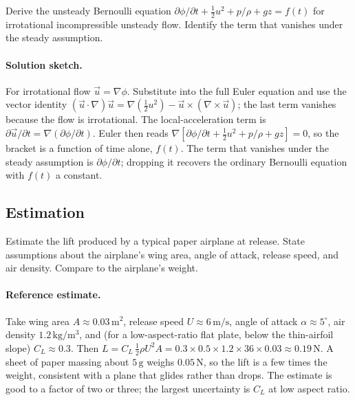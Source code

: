 \begin{exercise}
Derive the unsteady Bernoulli equation $\partial \phi/\partial t +
\tfrac{1}{2}u^2 + p/\rho + gz = f(t)$ for irrotational
incompressible unsteady flow. Identify the term that vanishes
under the steady assumption.

\paragraph{Solution sketch.} For irrotational flow $\vec{u} =
\nabla\phi$. Substitute into the full Euler equation and use the
vector identity $(\vec{u}\cdot\nabla)\vec{u} = \nabla(\tfrac12 u^2) -
\vec{u}\times(\nabla\times\vec{u})$; the last term vanishes because
the flow is irrotational. The local-acceleration term is
$\partial\vec{u}/\partial t = \nabla(\partial\phi/\partial t)$. Euler
then reads $\nabla[\partial\phi/\partial t + \tfrac12 u^2 + p/\rho +
gz] = 0$, so the bracket is a function of time alone, $f(t)$. The
term that vanishes under the steady assumption is $\partial\phi/
\partial t$; dropping it recovers the ordinary Bernoulli equation
with $f(t)$ a constant.
\end{exercise}

\subsection*{Estimation}

\begin{exercise}
Estimate the lift produced by a typical paper airplane at
release. State assumptions about the airplane's wing area, angle
of attack, release speed, and air density. Compare to the
airplane's weight.

\paragraph{Reference estimate.} Take wing area $A \approx
0.03\,\si{\meter}^2$, release speed $U \approx 6\,\si{\meter\per
\second}$, angle of attack $\alpha \approx 5^\circ$, air density
$1.2\,\si{\kilogram\per\meter\cubed}$, and (for a low-aspect-ratio
flat plate, below the thin-airfoil slope) $C_L \approx 0.3$. Then $L =
C_L\,\tfrac12\rho U^2 A = 0.3\times 0.5\times 1.2\times 36\times 0.03
\approx 0.19\,\si{\newton}$. A sheet of paper massing about
$5\,\si{\gram}$ weighs $0.05\,\si{\newton}$, so the lift is a few
times the weight, consistent with a plane that glides rather than
drops. The estimate is good to a factor of two or three; the largest
uncertainty is $C_L$ at low aspect ratio.
\end{exercise}

